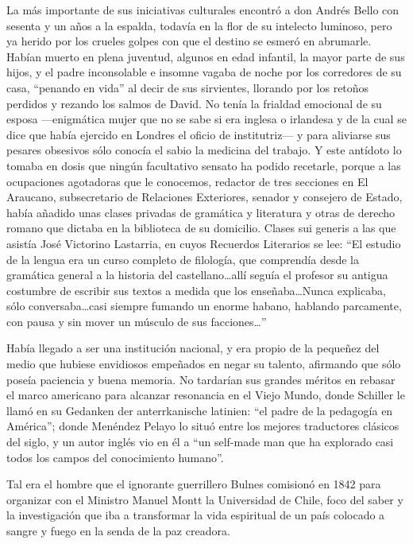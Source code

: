 \documentclass[10pt,twoside,openright]{memoir}
\begin{document}
La más importante de sus iniciativas culturales encontró a don Andrés
Bello con sesenta y un años a la espalda, todavía en la flor de su
intelecto luminoso, pero ya herido por los crueles golpes con que el
destino se esmeró en abrumarle. Habían muerto en plena juventud, algunos
en edad infantil, la mayor parte de sus hijos, y el padre inconsolable e
insomne vagaba de noche por los corredores de su casa, ``penando en vida''
al decir de sus sirvientes, llorando por los retoños perdidos y rezando
los salmos de David. No tenía la frialdad emocional de su esposa
---enigmática mujer que no se sabe si era inglesa o irlandesa y de la
cual se dice que había ejercido en Londres el oficio de institutriz--- y
para aliviarse sus pesares obsesivos sólo conocía el sabio la medicina
del trabajo. Y este antídoto lo tomaba en dosis que ningún facultativo
sensato ha podido recetarle, porque a las ocupaciones agotadoras que le
conocemos, redactor de tres secciones en El Araucano, subsecretario de
Relaciones Exteriores, senador y consejero de Estado, había añadido unas
clases privadas de gramática y literatura y otras de derecho romano que
dictaba en la biblioteca de su domicilio. Clases sui generis a las que
asistía José Victorino Lastarria, en cuyos Recuerdos Literarios se lee:
``El estudio de la lengua era un curso completo de filología, que
comprendía desde la gramática general a la historia del
castellano\ldots allí seguía el profesor su antigua costumbre de escribir
sus textos a medida que los enseñaba\ldots Nunca explicaba, sólo
conversaba\ldots casi siempre fumando un enorme habano, hablando
parcamente, con pausa y sin mover un músculo de sus facciones\ldots''

Había llegado a ser una institución nacional, y era propio de la
pequeñez del medio que hubiese envidiosos empeñados en negar su talento,
afirmando que sólo poseía paciencia y buena memoria. No tardarían sus
grandes méritos en rebasar el marco americano para alcanzar resonancia
en el Viejo Mundo, donde Schiller le llamó en su Gedanken der
anterrkanische latinien: ``el padre de la pedagogía en América''; donde
Menéndez Pelayo lo situó entre los mejores traductores clásicos del
siglo, y un autor inglés vio en él a ``un self-made man que ha explorado
casi todos los campos del conocimiento humano''.

Tal era el hombre que el ignorante guerrillero Bulnes comisionó en 1842
para organizar con el Ministro Manuel Montt la Universidad de Chile,
foco del saber y la investigación que iba a transformar la vida
espiritual de un país colocado a sangre y fuego en la senda de la paz
creadora.
\end{document}
